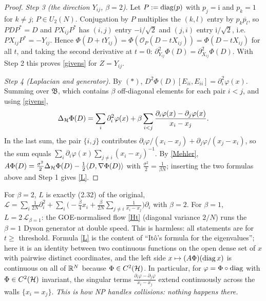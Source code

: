 \begin{proof}
\emph{Step 3 (the direction $Y_{ij}$, $\beta=2$).} Let $P:=\operatorname{diag}(p)$ with $p_j=\mathrm i$ and $p_k=1$ for $k\ne j$; $P\in U_2(N)$. Conjugation by $P$ multiplies the $(k,l)$ entry by $p_k\overline{p_l}$, so $PDP^*=D$ and $PX_{ij}P^*$ has $(i,j)$ entry $-\mathrm i/\sqrt2$ and $(j,i)$ entry $\mathrm i/\sqrt2$, i.e.\ $PX_{ij}P^*=-Y_{ij}$.
Hence $\Phi(D+tY_{ij})=\Phi(\mathcal O_P(D-tX_{ij}))=\Phi(D-tX_{ij})$ for all $t$, and taking the second derivative at $t=0$: $\partial^2_{Y_{ij}}\Phi(D)=\partial^2_{X_{ij}}\Phi(D)$. With Step 2 this proves \eqref{givens} for $Z=Y_{ij}$.

\emph{Step 4 (Laplacian and generator).} By $(\ast)$, $D^2\Phi(D)[E_{ii},E_{ii}]=\partial_i^2\varphi(x)$. Summing over $\mathfrak B$, which contains $\beta$ off-diagonal elements for each pair $i<j$, and using \eqref{givens},
\[\Delta_{\mathcal{H}}\Phi(D)=\sum_i\partial_i^2\varphi(x)+\beta\sum_{i<j}\frac{\partial_i\varphi(x)-\partial_j\varphi(x)}{x_i-x_j}.\]
In the last sum, the pair $\{i,j\}$ contributes $\partial_i\varphi/(x_i-x_j)+\partial_j\varphi/(x_j-x_i)$, so the sum equals $\sum_i\partial_i\varphi(x)\sum_{j\ne i}(x_i-x_j)^{-1}$.
By \eqref{Mehler}, $A\Phi(D)=\frac{\sigma^2}2\Delta_{\mathcal{H}}\Phi(D)-\frac12\langle D,\nabla\Phi(D)\rangle$ with $\frac{\sigma^2}{2}=\frac1{\beta N}$; inserting the two formulas above and Step 1 gives \eqref{L}.
\end{proof}

\begin{remark}\label{rem:gen}
For $\beta=2$, $L$ is exactly (2.32) of the original, $\mathcal L=\sum_i\frac1{2N}\partial_i^2+\sum_i\big(-\frac\beta4x_i+\frac\beta{2N}\sum_{j\ne i}\frac1{x_i-x_j}\big)\partial_i$ with $\beta=2$. For $\beta=1$, $L=2\,\mathcal L_{\beta=1}$: the GOE-normalised flow \eqref{Ht} (diagonal variance $2/N$) runs the $\beta=1$ Dyson generator at double speed. This is harmless: all statements are for $t\ge$ threshold.
Formula \eqref{L} is the content of ``It\^o's formula for the eigenvalues''; here it is an identity between two continuous functions on the open dense set of $x$ with pairwise distinct coordinates, and the left side $x\mapsto(A\Phi)(\operatorname{diag} x)$ is continuous on all of $\mathbb{R}^N$ because $\Phi\in C^2(\mathcal{H})$.
In particular, for $\varphi=\Phi\circ\operatorname{diag}$ with $\Phi\in C^2(\mathcal{H})$ invariant, the singular terms $\frac{\partial_i\varphi-\partial_j\varphi}{x_i-x_j}$ extend continuously across the walls $\{x_i=x_j\}$. \emph{This is how NP handles collisions: nothing happens there.}
\end{remark}

